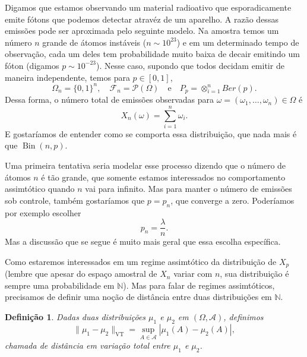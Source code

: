 \documentclass[reqno, final]{book}
\newcommand*\1{\mathds{1}}
\newtheorem{definition}[theorem]{Definição}
\DeclareMathOperator{\Bin}{Bin}
\DeclareMathOperator{\VT}{VT}
\begin{document}
Digamos que estamos observando um material radioativo que esporadicamente emite fótons que podemos detectar atravéz de um aparelho.
A razão dessas emissões pode ser aproximada pelo seguinte modelo.
Na amostra temos um número $n$ grande de átomos instáveis ($n \sim 10^{23}$) e em um determinado tempo de observação, cada um deles tem probabilidade muito baixa de decair emitindo um fóton (digamos $p \sim 10^{-23}$).
Nesse caso, supondo que todos decidam emitir de maneira independente, temos para $p \in [0,1]$,
\begin{equation}
  \label{e:Poisson_setup}
  \Omega_n = \{0,1\}^n, \quad \mathcal{F}_n = \mathcal{P}(\Omega) \quad \text{e} \quad P_p = \otimes_{i=1}^n Ber(p).
\end{equation}
Dessa forma, o número total de emissões observadas para $\omega = (\omega_1, \dots, \omega_n) \in \Omega$ é
\begin{equation}
  \label{e:Xn_Poisson}
  X_n(\omega) = \sum_{i=1}^n \omega_i.
\end{equation}
E gostaríamos de entender como se comporta essa distribuição, que nada mais é que $\Bin(n,p)$.

Uma primeira tentativa seria modelar esse processo dizendo que o número de átomos $n$ é tão grande, que somente estamos interessados no comportamento assimtótico quando $n$ vai para infinito.
Mas para manter o número de emissões sob controle, também gostaríamos que $p = p_n$, que converge a zero.
Poderíamos por exemplo escolher
\begin{equation}
  p_n = \frac \lambda n.
\end{equation}
Mas a discussão que se segue é muito mais geral que essa escolha específica.

Como estaremos interessados em um regime assimtótico da distribuição de $X_p$ (lembre que apesar do espaço amostral de $X_n$ variar com $n$, sua distribuição é sempre uma probabilidade em $\mathbb{N}$).
Mas para falar de regimes assimtóticos, precisamos de definir uma noção de distância entre duas distribuições em $\mathbb{N}$.

\begin{definition}
Dadas duas distribuições $\mu_1$ e $\mu_2$ em $(\Omega, \mathcal{A})$, definimos
\begin{equation}
  \lVert \mu_1 - \mu_2 \rVert_{\VT} = \sup_{A \in \mathcal{A}} |\mu_1(A) - \mu_2(A)|,
\end{equation}
 chamada de distância em variação total  entre $\mu_1$ e $\mu_2$.
\end{definition}
\end{document}
